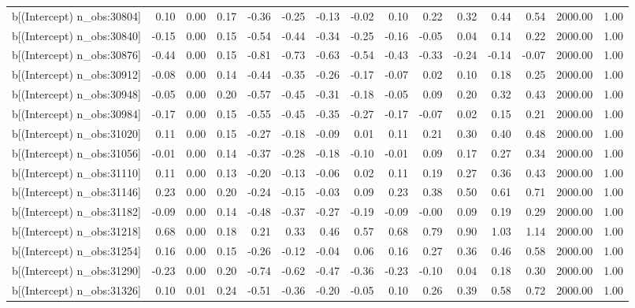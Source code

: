 \begin{table}[ht]
\begin{tabular}{rrrrrrrrrrrrrrr}
  b[(Intercept) n\_obs:30804] & 0.10 & 0.00 & 0.17 & -0.36 & -0.25 & -0.13 & -0.02 & 0.10 & 0.22 & 0.32 & 0.44 & 0.54 & 2000.00 & 1.00 \\ 
  b[(Intercept) n\_obs:30840] & -0.15 & 0.00 & 0.15 & -0.54 & -0.44 & -0.34 & -0.25 & -0.16 & -0.05 & 0.04 & 0.14 & 0.22 & 2000.00 & 1.00 \\ 
  b[(Intercept) n\_obs:30876] & -0.44 & 0.00 & 0.15 & -0.81 & -0.73 & -0.63 & -0.54 & -0.43 & -0.33 & -0.24 & -0.14 & -0.07 & 2000.00 & 1.00 \\ 
  b[(Intercept) n\_obs:30912] & -0.08 & 0.00 & 0.14 & -0.44 & -0.35 & -0.26 & -0.17 & -0.07 & 0.02 & 0.10 & 0.18 & 0.25 & 2000.00 & 1.00 \\ 
  b[(Intercept) n\_obs:30948] & -0.05 & 0.00 & 0.20 & -0.57 & -0.45 & -0.31 & -0.18 & -0.05 & 0.09 & 0.20 & 0.32 & 0.43 & 2000.00 & 1.00 \\ 
  b[(Intercept) n\_obs:30984] & -0.17 & 0.00 & 0.15 & -0.55 & -0.45 & -0.35 & -0.27 & -0.17 & -0.07 & 0.02 & 0.15 & 0.21 & 2000.00 & 1.00 \\ 
  b[(Intercept) n\_obs:31020] & 0.11 & 0.00 & 0.15 & -0.27 & -0.18 & -0.09 & 0.01 & 0.11 & 0.21 & 0.30 & 0.40 & 0.48 & 2000.00 & 1.00 \\ 
  b[(Intercept) n\_obs:31056] & -0.01 & 0.00 & 0.14 & -0.37 & -0.28 & -0.18 & -0.10 & -0.01 & 0.09 & 0.17 & 0.27 & 0.34 & 2000.00 & 1.00 \\ 
  b[(Intercept) n\_obs:31110] & 0.11 & 0.00 & 0.13 & -0.20 & -0.13 & -0.06 & 0.02 & 0.11 & 0.19 & 0.27 & 0.36 & 0.43 & 2000.00 & 1.00 \\ 
  b[(Intercept) n\_obs:31146] & 0.23 & 0.00 & 0.20 & -0.24 & -0.15 & -0.03 & 0.09 & 0.23 & 0.38 & 0.50 & 0.61 & 0.71 & 2000.00 & 1.00 \\ 
  b[(Intercept) n\_obs:31182] & -0.09 & 0.00 & 0.14 & -0.48 & -0.37 & -0.27 & -0.19 & -0.09 & -0.00 & 0.09 & 0.19 & 0.29 & 2000.00 & 1.00 \\ 
  b[(Intercept) n\_obs:31218] & 0.68 & 0.00 & 0.18 & 0.21 & 0.33 & 0.46 & 0.57 & 0.68 & 0.79 & 0.90 & 1.03 & 1.14 & 2000.00 & 1.00 \\ 
  b[(Intercept) n\_obs:31254] & 0.16 & 0.00 & 0.15 & -0.26 & -0.12 & -0.04 & 0.06 & 0.16 & 0.27 & 0.36 & 0.46 & 0.58 & 2000.00 & 1.00 \\ 
  b[(Intercept) n\_obs:31290] & -0.23 & 0.00 & 0.20 & -0.74 & -0.62 & -0.47 & -0.36 & -0.23 & -0.10 & 0.04 & 0.18 & 0.30 & 2000.00 & 1.00 \\ 
  b[(Intercept) n\_obs:31326] & 0.10 & 0.01 & 0.24 & -0.51 & -0.36 & -0.20 & -0.05 & 0.10 & 0.26 & 0.39 & 0.58 & 0.72 & 2000.00 & 1.00 \\ 

\end{tabular}
\end{table}
